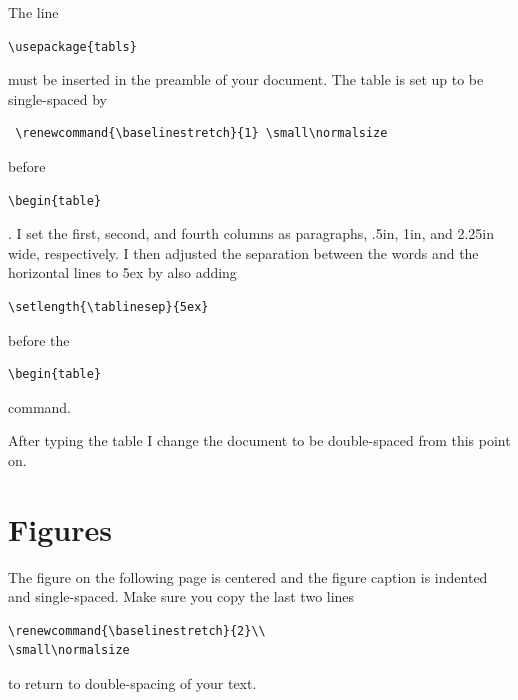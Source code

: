 \renewcommand{\baselinestretch}{2}
\small\normalsize

The line \begin{verbatim}\usepackage{tabls}\end{verbatim} must be inserted in the preamble of your document.
The table is set up to be single-spaced by \begin{verbatim} \renewcommand{\baselinestretch}{1} \small\normalsize\end{verbatim} before \begin{verbatim}\begin{table}\end{verbatim}.  I set the first, second, and fourth columns as paragraphs, .5in, 1in, and 2.25in wide, respectively.  I then adjusted the separation between the words and the horizontal lines to 5ex by also adding \begin{verbatim}\setlength{\tablinesep}{5ex}\end{verbatim} before the \begin{verbatim}\begin{table}\end{verbatim} command.

After typing the table I change the document to be double-spaced from this point on.

\newpage


\section{Figures}

The figure on the following page is centered and the figure caption is indented and single-spaced.  Make sure you copy the last two lines \begin{verbatim}
\renewcommand{\baselinestretch}{2}\\
\small\normalsize\end{verbatim} to return to double-spacing of your text.

